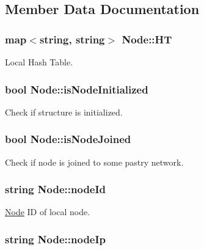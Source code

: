 \subsection{Member Data Documentation}
\hypertarget{classNode_aef05ed03e2d587ae1761c7dc4a1ad213}{
\subsubsection[{H\-T}]{\setlength{\rightskip}{0pt plus 5cm}map$<$string, string$>$ Node\-::\-H\-T}}\label{classNode_aef05ed03e2d587ae1761c7dc4a1ad213}
Local Hash Table. \hypertarget{classNode_ab125f5f050074e2dae467832069b9414}{
\subsubsection[{is\-Node\-Initialized}]{\setlength{\rightskip}{0pt plus 5cm}bool Node\-::is\-Node\-Initialized}}\label{classNode_ab125f5f050074e2dae467832069b9414}
Check if structure is initialized. \hypertarget{classNode_ab2c5c04cb6d0bec23f4dda36dc15710b}{
\subsubsection[{is\-Node\-Joined}]{\setlength{\rightskip}{0pt plus 5cm}bool Node\-::is\-Node\-Joined}}\label{classNode_ab2c5c04cb6d0bec23f4dda36dc15710b}
Check if node is joined to some pastry network. \hypertarget{classNode_a709c164657057a32cc79dd7a256ed744}{
\subsubsection[{node\-Id}]{\setlength{\rightskip}{0pt plus 5cm}string Node\-::node\-Id}}\label{classNode_a709c164657057a32cc79dd7a256ed744}
\hyperlink{classNode}{Node} I\-D of local node. \hypertarget{classNode_a59879ea3bcabb0ea5211dffcfbf49b73}{
\subsubsection[{node\-Ip}]{\setlength{\rightskip}{0pt plus 5cm}string Node\-::node\-Ip}}\label{classNode_a59879ea3bcabb0ea5211dffcfbf49b73}
